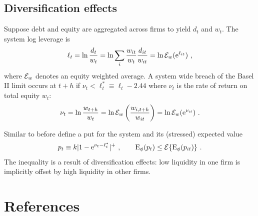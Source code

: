 \documentclass[authoryear]{elsarticle}
\newcommand{\e}{\mathrm{e}}
\newcommand{\Ex}{{\cal E}}
\newcommand{\cq}{\ , \qquad}
\newcommand{\be}[1]{\begin{equation}\label{#1}}
\newcommand{\ee}{\end{equation}}
\begin{document}
\subsection{Diversification effects} 

Suppose debt and equity are  aggregated across firms to yield $d_t$ and $w_t$.  The system log leverage is  
$$
\ell_t =  \ln \frac{d_t}{w_t} =  \ln \sum_i\frac{w_{it}}{w_t}\frac{ d_{it}}{ w_{it}} = \ln \Ex_w(\e^{\ell_{it}}) \ ,
$$
where $\Ex_w$ denotes an equity weighted average.  A system wide breach of the Basel II limit occurs at $t+h$ if
$
\nu_t < \ell_t^*\equiv \ell_t - 2.44
$
where $\nu_t$ is the rate of return on total equity $w_t$:
\be{ew}
 \nu_t = \ln \frac{w_{t+h}}{w_t} = \ln \Ex_w\left(\frac{w_{i,t+h}}{w_{it}}\right) = \ln \Ex_w(\e^{\nu_{it}})\ . 
\ee

Similar to before define a put for the system and its (stressed) expected value
$$
p_t\equiv k|1-\e^{\nu_t-\ell_t^*}|^+\cq \Es(p_t)\le\Ex\{\Es(p_{it})\}\ .
$$
The inequality is a result  of diversification effects:   low liquidity  in one firm is implicitly offset by high liquidity  in other  firms.







\section*{References}

\end{document}
